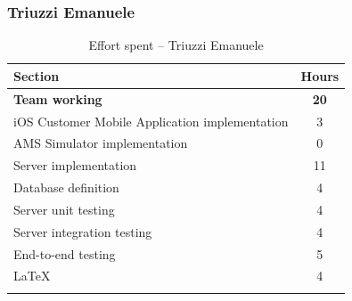 \documentclass[a4paper,oneside,11pt]{book}
\begin{document}
    \subsubsection{Triuzzi Emanuele}
    \begin{longtable}[c]{|H{.55\textwidth}|c|}
        \hline
        \textbf{Section} & {\bfseries{Hours}} \\ \hline
        \textbf{Team working} & \textbf{20} \\ \hline
        iOS Customer Mobile Application implementation                                  & 3 \\ \hline
        AMS Simulator implementation   & 0 \\ \hline
        Server implementation                          & 11 \\ \hline
        Database definition                         & 4 \\ \hline
        Server unit testing                         & 4 \\ \hline
        Server integration testing                           & 4 \\ \hline
        End-to-end testing                      & 5 \\ \hline
        \LaTeX                                 & 4 \\ \hline
        \caption{Effort spent -- Triuzzi Emanuele}
        \label{table:effort_triuzzi}
    \end{longtable}
\end{document}
